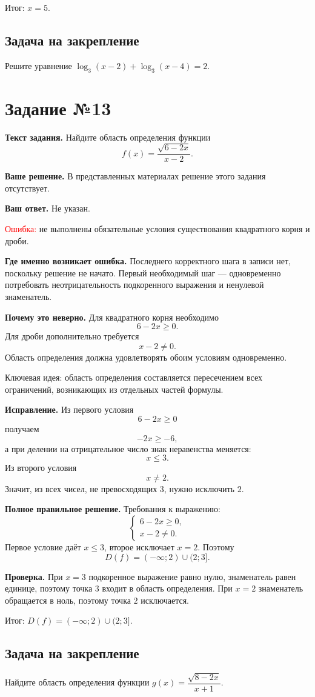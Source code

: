 \documentclass[12pt,a4paper]{article}
\newcommand{\err}{\textcolor{red}{Ошибка:}}
\newcommand{\idea}{\textcolor{blue!60!black}{Ключевая идея:}}
\newcommand{\result}{\textcolor{teal!60!black}{Итог:}}
\newcommand{\tasktitle}[1]{\phantomsection\label{task:#1}\section*{Задание №#1}}
\begin{document}
\result{} $x=5$.

\subsection*{Задача на закрепление}
Решите уравнение $\log_3(x-2)+\log_3(x-4)=2$.

\newpage
\tasktitle{13}
\textbf{Текст задания.} Найдите область определения функции
\[
f(x)=\frac{\sqrt{6-2x}}{x-2}.
\]

\textbf{Ваше решение.} В представленных материалах решение этого задания отсутствует.

\textbf{Ваш ответ.} Не указан.

\err{} не выполнены обязательные условия существования квадратного корня и дроби.

\textbf{Где именно возникает ошибка.} Последнего корректного шага в записи нет, поскольку решение не начато. Первый необходимый шаг --- одновременно потребовать неотрицательность подкоренного выражения и ненулевой знаменатель.

\textbf{Почему это неверно.} Для квадратного корня необходимо
\[
6-2x\geq0.
\]
Для дроби дополнительно требуется
\[
x-2\ne0.
\]
Область определения должна удовлетворять обоим условиям одновременно.

\idea{} область определения составляется пересечением всех ограничений, возникающих из отдельных частей формулы.

\textbf{Исправление.} Из первого условия
\[
6-2x\geq0
\]
получаем
\[
-2x\geq-6,
\]
а при делении на отрицательное число знак неравенства меняется:
\[
x\leq3.
\]
Из второго условия
\[
x\ne2.
\]
Значит, из всех чисел, не превосходящих $3$, нужно исключить $2$.

\textbf{Полное правильное решение.} Требования к выражению:
\[
\begin{cases}
6-2x\geq0,\\
x-2\ne0.
\end{cases}
\]
Первое условие даёт $x\leq3$, второе исключает $x=2$. Поэтому
\[
D(f)=(-\infty;2)\cup(2;3].
\]

\textbf{Проверка.} При $x=3$ подкоренное выражение равно нулю, знаменатель равен единице, поэтому точка $3$ входит в область определения. При $x=2$ знаменатель обращается в ноль, поэтому точка $2$ исключается.

\result{} $D(f)=(-\infty;2)\cup(2;3]$.

\subsection*{Задача на закрепление}
Найдите область определения функции $g(x)=\dfrac{\sqrt{8-2x}}{x+1}$.
\end{document}
